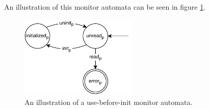 An illustration of this monitor automata can be seen in figure \ref{use-before-automata}. 

\begin{figure}[H]
    \centering
    \includegraphics[width=0.5\textwidth]{background/figures/use-before}
    \caption{An illustration of a use-before-init monitor automata.}
    \label{use-before-automata}
\end{figure}